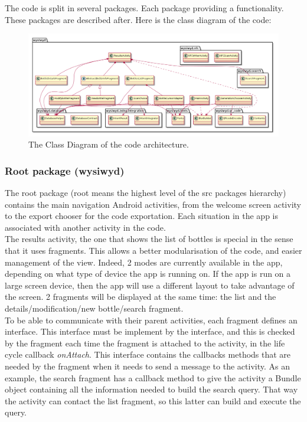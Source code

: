 The code is split in several packages. Each package providing a functionality. These packages are described after. Here is the class diagram of the code:
\begin{landscape}
\begin{figure}[H]
\begin{center}
	\includegraphics[width=\textwidth]{Images/ClassDiagram.png}
	\caption{The Class Diagram of the code architecture.}
\end{center}
\end{figure}
\end{landscape}
\subsubsection{Root package (wysiwyd)}

The root package (root means the highest level of the src packages hierarchy) contains the main navigation Android activities, from the welcome screen activity to the export chooser for the code exportation. Each situation in the app is associated with another activity in the code.\\

The results activity, the one that shows the list of bottles is special in the sense that it uses fragments. This allows a better modularisation of the code, and easier management of the view. Indeed, 2 modes are currently available in the app, depending on what type of device the app is running on. If the app is run on a large screen device, then the app will use a different layout to take advantage of the screen. 2 fragments will be displayed at the same time: the list and the details/modification/new bottle/search fragment.\\

To be able to communicate with their parent activities, each fragment defines an interface. This interface must be implement by the interface, and this is checked by the fragment each time the fragment is attached to the activity, in the life cycle callback \emph{onAttach}. This interface contains the callbacks methods that are needed by the fragment when it needs to send a message to the activity. As an example, the search fragment has a callback method to give the activity a Bundle object containing all the information needed to build the search query. That way the activity can contact the list fragment, so this latter can build and execute the query.\\

